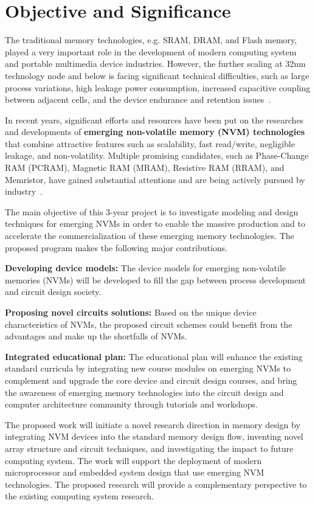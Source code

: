 \section{Objective and Significance}

The traditional memory technologies, e.g. SRAM, DRAM, and Flash memory, played a very important role in the development of modern computing system and portable multimedia device industries. However, the further scaling at 32nm technology node and below is facing significant technical difficulties, such as large process variations, high leakage power consumption, increased capacitive coupling between adjacent cells, and the device endurance and retention issues~\cite{ITRS07,Kinam07}.

In recent years, significant efforts and resources have been put on the researches and developments of \textbf{emerging non-volatile memory (NVM) technologies} that combine attractive features such as scalability, fast read/write, negligible leakage, and non-volatility. Multiple promising candidates, such as Phase-Change RAM (PCRAM), Magnetic RAM (MRAM), Resistive RAM (RRAM), and Memristor, have gained substantial attentions and are being actively pursued by industry~\cite{ITRS07,burr:scm08}.

 The main objective of this 3-year project is to investigate modeling and design techniques for emerging NVMs in order to enable the massive production and to accelerate the commercialization of these emerging memory technologies. The proposed program makes the following major contributions.

\vspace{5pt}
\squishlist
\item {\textbf{Developing device models:} The device models for emerging non-volatile memories (NVMs) will be developed to fill the gap between process development and circuit design society.}
\item {\textbf{Proposing novel circuits solutions:} Based on the unique device characteristics of NVMs, the proposed circuit schemes could benefit from the advantages and make up the shortfalls of NVMs.}
\item {\textbf{Integrated educational plan:} The educational plan will enhance the existing standard curricula by integrating new course modules on emerging NVMs to complement and upgrade the core device and circuit design courses, and bring the awareness of emerging memory technologies into the circuit design and computer architecture community through tutorials and workshops.}
\squishend
\vspace{5pt}

The proposed work will initiate a novel research direction in memory design by integrating NVM devices into the standard memory design flow, inventing novel array structure and circuit techniques, and investigating the impact to future computing system. The work will support the deployment of modern microprocessor and embedded system design that use emerging NVM technologies. The proposed research will provide a complementary perspective to the existing computing system research.

